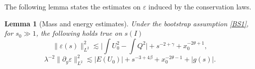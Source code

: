 \documentclass[16pt,english, oneside,reqno]{smfart}
\newcommand{\vare}{{\varepsilon}}
\newtheorem{lemma}[theorem]{Lemma}
\begin{document}
\vspace{0.3cm}
The following lemma states the estimates on $\vare$ induced by the conservation laws.
\begin{lemma}[Mass and energy estimates]
    Under the bootstrap assumption \eqref{BS1}, for $s_0 \gg 1$, the following holds true on $s(I)$
    \begin{equation}\label{estimate_on_L2_norm_of_vare}
        \|\vare(s) \|^2_{L^2} \lesssim \Big\lvert\int U^2_0 - \int Q^2  \Big\rvert + s^{-2+\gamma}+ x^{-2\theta+1}_0,
    \end{equation}
    \begin{equation}\label{estimate_on_L2_norm_of_grad_vare}
        \lambda^{-2}\|\partial_y \vare\|^2_{L^2} \lesssim \lvert E(U_0)\rvert+s^{-3+4\beta}+x^{-2\theta-1}_0 + |g(s)|.
    \end{equation}
\end{lemma}
\end{document}
